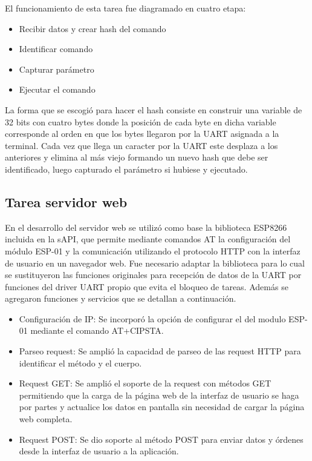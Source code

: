 El funcionamiento de esta tarea fue diagramado en cuatro etapa:
\begin{itemize}
	\item Recibir datos y crear hash del comando
	\item Identificar comando
	\item Capturar parámetro
	\item Ejecutar el comando
\end{itemize}	

La forma que se escogió para hacer el hash consiste en construir una variable de 32 bits con cuatro bytes donde la posición de cada byte en dicha variable corresponde al orden en que los bytes llegaron por la UART asignada a la terminal. Cada vez que llega un caracter por la UART este desplaza a los anteriores y elimina al más viejo formando un nuevo hash que debe ser identificado, luego capturado el parámetro si hubiese y ejecutado.


\subsection{Tarea servidor web}

En el desarrollo del servidor web se utilizó como base la biblioteca ESP8266 incluida en la sAPI, que permite mediante comandos AT la configuración del módulo ESP-01 y la comunicación utilizando el protocolo HTTP con la interfaz de usuario en un navegador web. Fue necesario adaptar la biblioteca para lo cual se sustituyeron las  funciones originales para recepción de datos de la UART por funciones del driver UART propio que evita el bloqueo de tareas.
Además se agregaron funciones y servicios que se detallan a continuación.
\begin{itemize}
	\item Configuración de IP: Se incorporó la opción de configurar el del modulo ESP-01 mediante el comando AT+CIPSTA.
	\item Parseo request: Se amplió la capacidad de parseo de las request HTTP para identificar el método y el cuerpo.
	\item Request GET: Se amplió el soporte de la request con métodos GET permitiendo que la carga de la página web de la interfaz de usuario se haga por partes y actualice los datos en pantalla sin necesidad de cargar la página web completa.
	\item Request POST: Se dio soporte al método POST para enviar datos y órdenes desde la interfaz de usuario a la aplicación.
\end{itemize}

